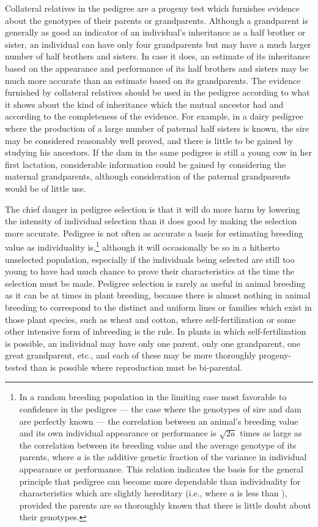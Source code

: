 Collateral relatives in the pedigree are a progeny test which furnishes
evidence about the genotypes of their parents or grandparents.
Although a grandparent is generally as good an indicator of an individual's
inheritance as a half brother or sister, an individual can have
only four grandparents but may have a much larger number of half
brothers and sisters. In case it does, an estimate of its inheritance based
on the appearance and performance of its half brothers and sisters may
be much more accurate than an estimate based on its grandparents. The
evidence furnished by collateral relatives should be used in the pedigree
according to what it shows about the kind of inheritance which
the mutual ancestor had and according to the completeness of the evidence.
For example, in a dairy pedigree where the production of a
large number of paternal half sisters is known, the sire may be considered
reasonably well proved, and there is little to be gained by studying
his ancestors. If the dam in the same pedigree is still a young cow in her
first lactation, considerable information could be gained by considering
the maternal grandparents, although consideration of the paternal
grandparents would be of little use.

The chief danger in pedigree selection is that it will do more harm
by lowering the intensity of individual selection than it does good by
making the selection more accurate. Pedigree is not often as accurate a
basis for estimating breeding value as individuality is,\footnote{In a random
breeding population in the limiting case most favorable to confidence
in the pedigree --- the case where the genotypes of sire and dam are perfectly
known --- the correlation between an animal's breeding value and its own individual
appearance or performance is \(\sqrt{2a}\) times as large as the correlation between its breeding
value and the average genotype of its parents, where $a$ is the additive genetic
fraction of the variance in individual appearance or performance. This relation indicates
the basis for the general principle that pedigree can become more dependable
than individuality for characteristics which are slightly hereditary (i.e., where $a$ is
less than ), provided the parents are so thoroughly known that there is little
doubt about their genotypes.} although it will
occasionally be so in a hitherto unselected population, especially if the
individuals being selected are still too young to have had much chance
to prove their characteristics at the time the selection must be made.
Pedigree selection is rarely as useful in animal breeding as it can be at
times in plant breeding, because there is almost nothing in animal
breeding to correspond to the distinct and uniform lines or families
which exist in those plant species, such as wheat and cotton, where self-fertilization
or some other intensive form of inbreeding is the rule. In
plants in which self-fertilization is possible, an individual may have
only one parent, only one grandparent, one great grandparent, etc., and
each of these may be more thoroughly progeny-tested than is possible
where reproduction must be bi-parental.

